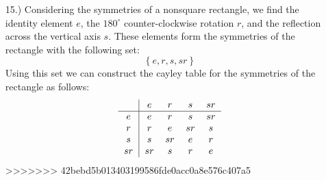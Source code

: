 \documentclass[12pt]{article}
\newcommand{\braces}[1]{\left\{#1\right\}}           %
\begin{document}
\begin{itemize}
    \item [15.)] Considering the symmetries of a nonsquare rectangle, we find the identity element $e$, the $180^\circ$ counter-clockwise rotation $r$, and the reflection across the vertical axis $s$. These elements form the symmetries of the rectangle with the following set:
    \[\braces{e,r,s,sr}\]
    Using this set we can construct the cayley table for the symmetries of the rectangle as follows:
    \[
        \begin{tabular}{c|cccc}
            & $e$ & $r$ & $s$ & $sr$ \\
            \hline
            $e$ & $e$ & $r$ & $s$ & $sr$ \\
            $r$ & $r$ & $e$ & $sr$ & $s$ \\
            $s$ & $s$ & $sr$ & $e$ & $r$ \\
            $sr$ & $sr$ & $s$ & $r$ & $e$
        \end{tabular}
    \]
>>>>>>> 42bebd5b013403199586fde0acc0a8e576c407a5

\end{itemize}
\end{document}
